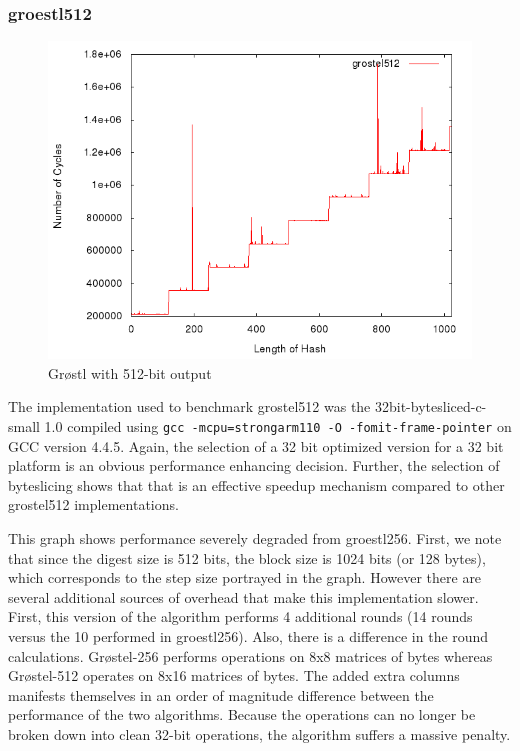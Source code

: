 \documentclass[10pt,a4paper]{article}
\begin{document}
\subsubsection{groestl512}
    \begin{figure}[H]
        \begin{center}
            \includegraphics[scale=0.5]{images/grostel512.png} 
            \caption{Gr{\o}stl with 512-bit output}
        \end{center}
    \end{figure}

The implementation used to benchmark grostel512 was the 32bit-bytesliced-c-small
1.0 compiled using \texttt{gcc -mcpu=strongarm110 -O -fomit-frame-pointer} on
GCC version 4.4.5. Again, the selection of a 32 bit optimized version for a 32
bit platform is an obvious performance enhancing decision. Further, the
selection of byteslicing shows that that is an effective speedup mechanism
compared to other grostel512 implementations.

This graph shows performance severely degraded from groestl256.  First, we note that since the digest size is 512 bits, the block size is 1024 bits (or 128 bytes), which corresponds to the step size portrayed in the graph.  However there are several additional sources of overhead that make this implementation slower.  First, this version of the algorithm performs 4 additional rounds (14 rounds versus the 10 performed in groestl256).  Also, there is a difference in the round calculations.  Gr{\o}stel-256 performs operations on 8x8 matrices of bytes whereas Gr{\o}stel-512 operates on 8x16 matrices of bytes.  The added extra columns manifests themselves in an order of magnitude difference between the performance of the two algorithms.  Because the operations can no longer be broken down into clean 32-bit operations, the algorithm suffers a massive penalty.
\end{document}
